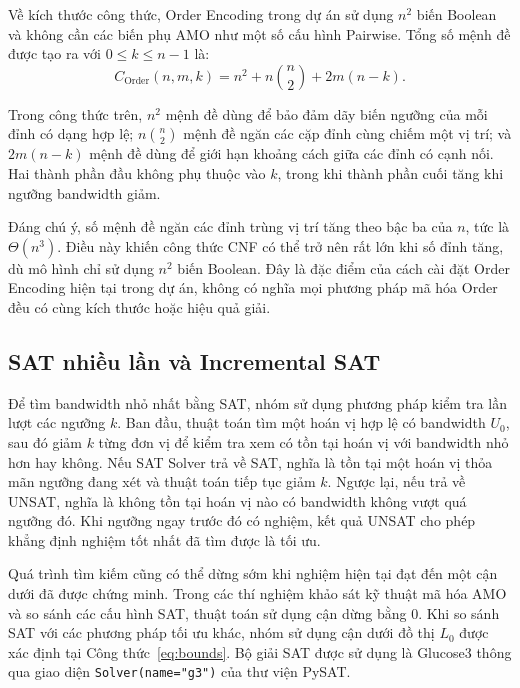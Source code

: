 \documentclass[a4paper,fleqn]{cas-sc}
\newcommand{\code}[1]{\nolinkurl{#1}}
\begin{document}
Về kích thước công thức, Order Encoding trong dự án sử dụng $n^2$ biến Boolean và không cần các biến phụ AMO như một số cấu hình Pairwise. Tổng số mệnh đề được tạo ra với $0\leq k\leq n-1$ là:
\begin{equation}
C_{\mathrm{Order}}(n,m,k)
=n^2+n\binom{n}{2}+2m(n-k).
\label{eq:order-size}
\end{equation}

Trong công thức trên, $n^2$ mệnh đề dùng để bảo đảm dãy biến ngưỡng của mỗi đỉnh có dạng hợp lệ; $n\binom{n}{2}$ mệnh đề ngăn các cặp đỉnh cùng chiếm một vị trí; và $2m(n-k)$ mệnh đề dùng để giới hạn khoảng cách giữa các đỉnh có cạnh nối. Hai thành phần đầu không phụ thuộc vào $k$, trong khi thành phần cuối tăng khi ngưỡng bandwidth giảm.

Đáng chú ý, số mệnh đề ngăn các đỉnh trùng vị trí tăng theo bậc ba của $n$, tức là $\Theta(n^3)$. Điều này khiến công thức CNF có thể trở nên rất lớn khi số đỉnh tăng, dù mô hình chỉ sử dụng $n^2$ biến Boolean. Đây là đặc điểm của cách cài đặt Order Encoding hiện tại trong dự án, không có nghĩa mọi phương pháp mã hóa Order đều có cùng kích thước hoặc hiệu quả giải.



\subsection{SAT nhiều lần và Incremental SAT}

Để tìm bandwidth nhỏ nhất bằng SAT, nhóm sử dụng phương pháp kiểm tra lần lượt các ngưỡng $k$. Ban đầu, thuật toán tìm một hoán vị hợp lệ có bandwidth $U_0$, sau đó giảm $k$ từng đơn vị để kiểm tra xem có tồn tại hoán vị với bandwidth nhỏ hơn hay không. Nếu SAT Solver trả về SAT, nghĩa là tồn tại một hoán vị thỏa mãn ngưỡng đang xét và thuật toán tiếp tục giảm $k$. Ngược lại, nếu trả về UNSAT, nghĩa là không tồn tại hoán vị nào có bandwidth không vượt quá ngưỡng đó. Khi ngưỡng ngay trước đó có nghiệm, kết quả UNSAT cho phép khẳng định nghiệm tốt nhất đã tìm được là tối ưu.

Quá trình tìm kiếm cũng có thể dừng sớm khi nghiệm hiện tại đạt đến một cận dưới đã được chứng minh. Trong các thí nghiệm khảo sát kỹ thuật mã hóa AMO và so sánh các cấu hình SAT, thuật toán sử dụng cận dừng bằng 0. Khi so sánh SAT với các phương pháp tối ưu khác, nhóm sử dụng cận dưới đồ thị $L_0$ được xác định tại Công thức~\eqref{eq:bounds}. Bộ giải SAT được sử dụng là Glucose3 thông qua giao diện \code{Solver(name="g3")} của thư viện PySAT.
\end{document}
